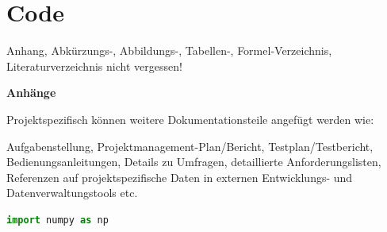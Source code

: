 \chapter{Code}
\label{ch:Code}
Anhang, Abkürzungs-, Abbildungs-, Tabellen-, Formel-Verzeichnis, Literaturverzeichnis nicht vergessen!\par
\textbf{Anhänge}

Projektspezifisch können weitere Dokumentationsteile angefügt werden wie:

Aufgabenstellung, Projektmanagement-Plan/Bericht, Testplan/Testbericht, Bedienungsanleitungen, Details zu Umfragen, detaillierte Anforderungslisten, Referenzen auf projektspezifische Daten in externen Entwicklungs- und Datenverwaltungstools etc.
\begin{lstlisting}[caption={Caption on PDF}, label={lst:reference_this}, language=Python]
import numpy as np
\end{lstlisting}